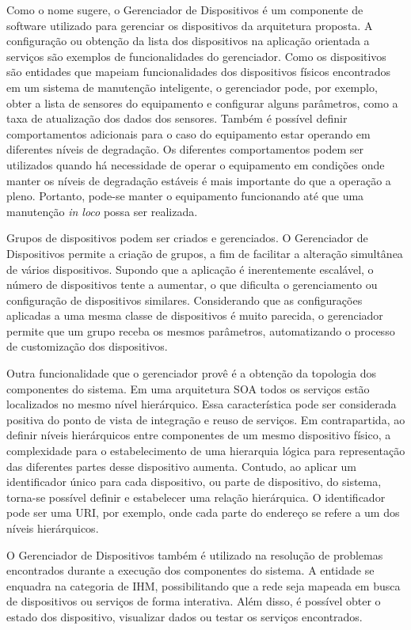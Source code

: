 Como o nome sugere, o Gerenciador de Dispositivos é um componente de software utilizado para
gerenciar os dispositivos da arquitetura proposta. A configuração ou obtenção da lista dos
dispositivos na aplicação orientada a serviços são exemplos de funcionalidades do gerenciador. Como
os dispositivos são entidades que mapeiam funcionalidades dos dispositivos físicos encontrados em um
sistema de manutenção inteligente, o gerenciador pode, por exemplo, obter a lista de sensores do
equipamento e configurar alguns parâmetros, como a taxa de atualização dos dados dos sensores.
Também é possível definir comportamentos adicionais para o caso do equipamento estar operando em
diferentes níveis de degradação. Os diferentes comportamentos podem ser utilizados quando há
necessidade de operar o equipamento em condições onde manter os níveis de degradação estáveis é mais
importante do que a operação a pleno. Portanto, pode-se manter o equipamento funcionando até que uma
manutenção \textit{in loco} possa ser realizada.

Grupos de dispositivos podem ser criados e gerenciados. O Gerenciador de Dispositivos permite a
criação de grupos, a fim de facilitar a alteração simultânea de vários dispositivos. Supondo que a
aplicação é inerentemente escalável, o número de dispositivos tente a aumentar, o que dificulta o
gerenciamento ou configuração de dispositivos similares. Considerando que as configurações aplicadas
a uma mesma classe de dispositivos é muito parecida, o gerenciador permite que um grupo receba os
mesmos parâmetros, automatizando o processo de customização dos dispositivos.

Outra funcionalidade que o gerenciador provê é a obtenção da topologia dos componentes do sistema.
Em uma arquitetura \gls{SOA} todos os serviços estão localizados no mesmo nível hierárquico. Essa
característica pode ser considerada positiva do ponto de vista de integração e reuso de serviços. Em
contrapartida, ao definir níveis hierárquicos entre componentes de um mesmo dispositivo físico, a
complexidade para o estabelecimento de uma hierarquia lógica para representação das diferentes
partes desse dispositivo aumenta. Contudo, ao aplicar um identificador único para cada dispositivo,
ou parte de dispositivo, do sistema, torna-se possível definir e estabelecer uma relação
hierárquica. O identificador pode ser uma \gls{URI}, por exemplo, onde cada parte do endereço se
refere a um dos níveis hierárquicos.

O Gerenciador de Dispositivos também é utilizado na resolução de problemas encontrados durante a
execução dos componentes do sistema. A entidade se enquadra na categoria de \gls{IHM},
possibilitando que a rede seja mapeada em busca de dispositivos ou serviços de forma interativa.
Além disso, é possível obter o estado dos dispositivo, visualizar dados ou testar os serviços
encontrados.


